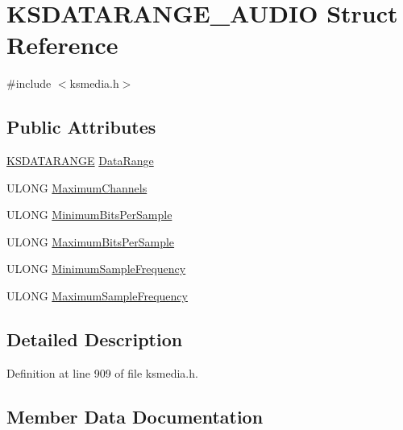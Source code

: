 \hypertarget{struct_k_s_d_a_t_a_r_a_n_g_e___a_u_d_i_o}{}\section{K\+S\+D\+A\+T\+A\+R\+A\+N\+G\+E\+\_\+\+A\+U\+D\+IO Struct Reference}
\label{struct_k_s_d_a_t_a_r_a_n_g_e___a_u_d_i_o}


{\ttfamily \#include $<$ksmedia.\+h$>$}

\subsection*{Public Attributes}
\begin{DoxyCompactItemize}
\item 
\hyperlink{ks_8h_a1ea8bc535eaf96036403dc325623b469}{K\+S\+D\+A\+T\+A\+R\+A\+N\+GE} \hyperlink{struct_k_s_d_a_t_a_r_a_n_g_e___a_u_d_i_o_ac813d951cb63f7de6b5e0cc7c18c136d}{Data\+Range}
\item 
U\+L\+O\+NG \hyperlink{struct_k_s_d_a_t_a_r_a_n_g_e___a_u_d_i_o_a0833265b8f9cc420f2321b9bbe8aa6ae}{Maximum\+Channels}
\item 
U\+L\+O\+NG \hyperlink{struct_k_s_d_a_t_a_r_a_n_g_e___a_u_d_i_o_a6da7ed494cfa0f11cfe1d91c664f0871}{Minimum\+Bits\+Per\+Sample}
\item 
U\+L\+O\+NG \hyperlink{struct_k_s_d_a_t_a_r_a_n_g_e___a_u_d_i_o_ab16363498207d22501834543f35c3afd}{Maximum\+Bits\+Per\+Sample}
\item 
U\+L\+O\+NG \hyperlink{struct_k_s_d_a_t_a_r_a_n_g_e___a_u_d_i_o_aee794ef5401e207da52714156369073a}{Minimum\+Sample\+Frequency}
\item 
U\+L\+O\+NG \hyperlink{struct_k_s_d_a_t_a_r_a_n_g_e___a_u_d_i_o_ab17b43eea8ed34632c193818125e7ca2}{Maximum\+Sample\+Frequency}
\end{DoxyCompactItemize}


\subsection{Detailed Description}


Definition at line 909 of file ksmedia.\+h.



\subsection{Member Data Documentation}
